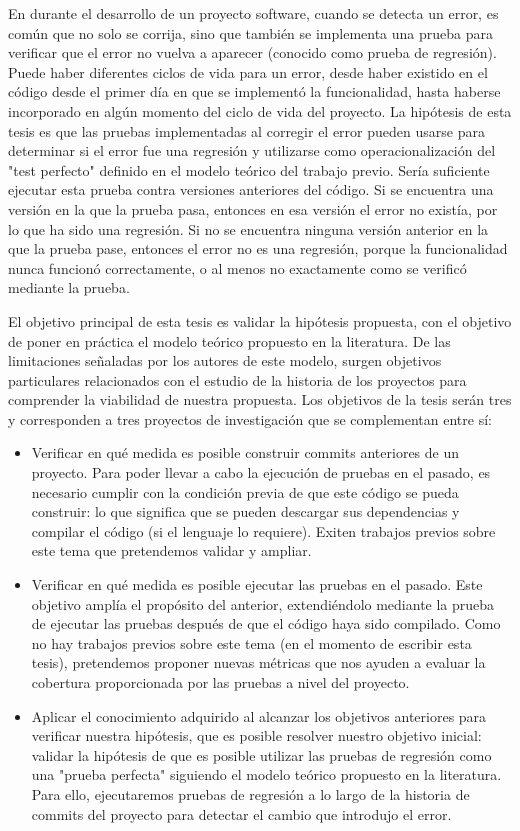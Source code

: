 En durante el desarrollo de un proyecto software, cuando se detecta un error, es común que no solo se corrija, sino que también se implementa una prueba para verificar que el error no vuelva a aparecer (conocido como prueba de regresión). 
Puede haber diferentes ciclos de vida para un error, desde haber existido en el código desde el primer día en que se implementó la funcionalidad, hasta haberse incorporado en algún momento del ciclo de vida del proyecto.
La hipótesis de esta tesis es que las pruebas implementadas al corregir el error pueden usarse para determinar si el error fue una regresión y utilizarse como operacionalización del "test perfecto" definido en el modelo teórico del trabajo previo. 
Sería suficiente ejecutar esta prueba contra versiones anteriores del código. 
Si se encuentra una versión en la que la prueba pasa, entonces en esa versión el error no existía, por lo que ha sido una regresión. 
Si no se encuentra ninguna versión anterior en la que la prueba pase, entonces el error no es una regresión, porque la funcionalidad nunca funcionó correctamente, o al menos no exactamente como se verificó mediante la prueba.

El objetivo principal de esta tesis es validar la hipótesis propuesta, con el objetivo de poner en práctica el modelo teórico propuesto en la literatura. 
De las limitaciones señaladas por los autores de este modelo, surgen objetivos particulares relacionados con el estudio de la historia de los proyectos para comprender la viabilidad de nuestra propuesta. 
Los objetivos de la tesis serán tres y corresponden a tres proyectos de investigación que se complementan entre sí:
\begin{itemize}
    \item Verificar en qué medida es posible construir commits anteriores de un proyecto. Para poder llevar a cabo la ejecución de pruebas en el pasado, es necesario cumplir con la condición previa de que este código se pueda construir: lo que significa que se pueden descargar sus dependencias y compilar el código (si el lenguaje lo requiere). Exiten trabajos previos sobre este tema que pretendemos validar y ampliar.
    \item Verificar en qué medida es posible ejecutar las pruebas en el pasado. Este objetivo amplía el propósito del anterior, extendiéndolo mediante la prueba de ejecutar las pruebas después de que el código haya sido compilado. Como no hay trabajos previos sobre este tema (en el momento de escribir esta tesis), pretendemos proponer nuevas métricas que nos ayuden a evaluar la cobertura proporcionada por las pruebas a nivel del proyecto.
    \item Aplicar el conocimiento adquirido al alcanzar los objetivos anteriores para verificar nuestra hipótesis, que es posible resolver nuestro objetivo inicial: validar la hipótesis de que es posible utilizar las pruebas de regresión como una "prueba perfecta" siguiendo el modelo teórico propuesto en la literatura. Para ello, ejecutaremos pruebas de regresión a lo largo de la historia de commits del proyecto para detectar el cambio que introdujo el error.
\end{itemize}




